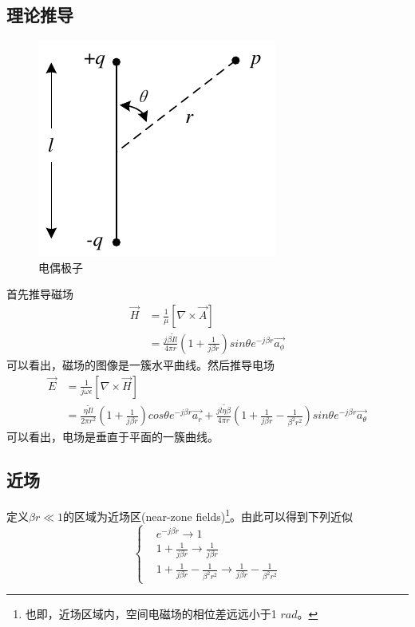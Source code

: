 \documentclass[lang=cn,11pt]{elegantpaper}
\begin{document}
\subsection{理论推导}
\begin{figure}[ht]
  \centering
  \includegraphics[width=0.3\linewidth]{figure//Hertzian_Dipole.pdf}
  \vspace{-0.3cm}
  \caption{电偶极子}\label{fig:Hertazian_Dipole}
\end{figure}
首先推导磁场
\begin{equation}
  \begin{aligned}
    \vec{H} &= \frac{1}{\mu}\left[\nabla\times \vec{A} \right] \\
            & = \frac{j\beta \widetilde{I}l}{4\pi r}\left(1 + \frac{1}{j\beta r}\right)sin \theta {} e^{-j\beta r} \vec{a_{\phi}}
\end{aligned}
\end{equation}
可以看出，磁场的图像是一簇水平曲线。然后推导电场
\begin{equation}
  \begin{aligned}
    \vec{E} &= \frac{1}{j\omega \epsilon}\left[\nabla \times \vec{H}\right] \\
    &= \frac{\eta \widetilde{I}l}{2\pi r^2}\left(1 + \frac{1}{j\beta r} \right)cos\theta e^{-j\beta r}\vec{a_r}+\frac{j\widetilde{l\eta \beta}}{4\pi r}\left(1+\frac{1}{j\beta r} - \frac{1}{{\beta}^2r^2}\right)sin\theta e^{-j\beta r}\vec{a_{\theta}}
  \end{aligned}
\end{equation}
可以看出，电场是垂直于平面的一簇曲线。
\subsection{近场}
定义$\beta r \ll 1$的区域为近场区(near-zone fields)\footnote{也即，近场区域内，空间电磁场的相位差远远小于1 $rad$。}。由此可以得到下列近似
\begin{equation}
  \left\{\begin{aligned}
    & e^{-j\beta r}\rightarrow 1 \\
    & 1 + \frac{1}{j\beta r} \rightarrow \frac{1}{j\beta r} \\
    & 1 + \frac{1}{j\beta r} - \frac{1}{{\beta}^2 r^2} \rightarrow \frac{1}{j\beta r} - \frac{1}{{\beta}^2 r^2}
  \end{aligned}\right.
\end{equation}
\end{document}
